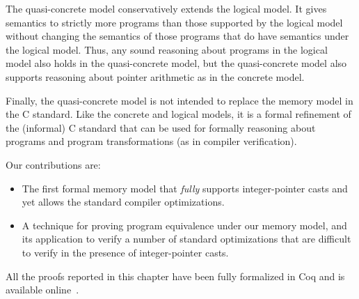 The quasi-concrete model conservatively extends the logical model.  It
gives semantics to strictly more programs than those supported by the
logical model without changing the semantics of those programs that do
have semantics under the logical model. Thus, any sound reasoning
about programs in the logical model also holds in the quasi-concrete
model, but the quasi-concrete model also supports reasoning about
pointer arithmetic as in the concrete model.

Finally, the quasi-concrete model is not intended to replace the
memory model in the C standard. Like the concrete and logical models,
it is a formal refinement of the (informal) C standard that can be
used for formally reasoning about programs and program transformations
(as in compiler verification).

\medskip \noindent
Our contributions are:
\begin{itemize}
\item The first formal memory model that \emph{fully} supports
  integer-pointer casts and yet allows the standard compiler
  optimizations.
\item A technique for proving program equivalence under our memory
model, and its application to verify a number of standard optimizations
that are difficult to verify in the presence of integer-pointer casts.
\end{itemize}

All the proofs reported in this chapter have been fully formalized in Coq and is available
online~\cite{kang-phd-thesis-web}.

%
%
%
%


